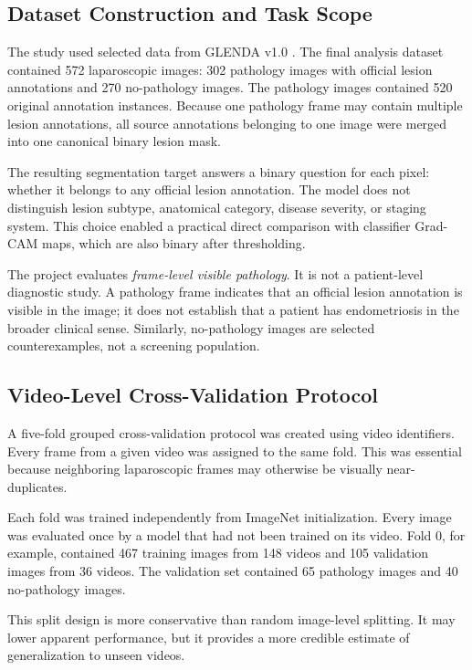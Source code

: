 \subsection{Dataset Construction and Task Scope}

The study used selected data from GLENDA v1.0 \cite{leibetseder2020glenda}. The final analysis dataset contained 572 laparoscopic images: 302 pathology images with official lesion annotations and 270 no-pathology images. The pathology images contained 520 original annotation instances. Because one pathology frame may contain multiple lesion annotations, all source annotations belonging to one image were merged into one canonical binary lesion mask.

The resulting segmentation target answers a binary question for each pixel: whether it belongs to any official lesion annotation. The model does not distinguish lesion subtype, anatomical category, disease severity, or staging system. This choice enabled a practical direct comparison with classifier Grad-CAM maps, which are also binary after thresholding.

The project evaluates \emph{frame-level visible pathology}. It is not a patient-level diagnostic study. A pathology frame indicates that an official lesion annotation is visible in the image; it does not establish that a patient has endometriosis in the broader clinical sense. Similarly, no-pathology images are selected counterexamples, not a screening population.

\subsection{Video-Level Cross-Validation Protocol}

A five-fold grouped cross-validation protocol was created using video identifiers. Every frame from a given video was assigned to the same fold. This was essential because neighboring laparoscopic frames may otherwise be visually near-duplicates.

Each fold was trained independently from ImageNet initialization. Every image was evaluated once by a model that had not been trained on its video. Fold 0, for example, contained 467 training images from 148 videos and 105 validation images from 36 videos. The validation set contained 65 pathology images and 40 no-pathology images.

This split design is more conservative than random image-level splitting. It may lower apparent performance, but it provides a more credible estimate of generalization to unseen videos.


